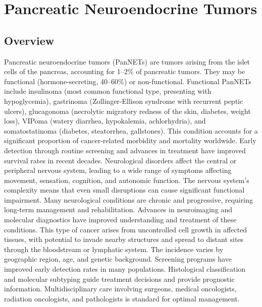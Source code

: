 \chapter{Pancreatic Neuroendocrine Tumors}
\label{sec:Pancreatic Neuroendocrine Tumors}

\section{Overview}
Pancreatic neuroendocrine tumors (PanNETs) are tumors arising from the islet cells of the pancreas, accounting for 1--2\% of pancreatic tumors. They may be functional (hormone-secreting, 40--60\%) or non-functional. Functional PanNETs include insulinoma (most common functional type, presenting with hypoglycemia), gastrinoma (Zollinger-Ellison syndrome with recurrent peptic ulcers), glucagonoma (necrolytic migratory redness of the skin, diabetes, weight loss), VIPoma (watery diarrhea, hypokalemia, achlorhydria), and somatostatinoma (diabetes, steatorrhea, gallstones). This condition accounts for a significant proportion of cancer-related morbidity and mortality worldwide. Early detection through routine screening and advances in treatment have improved survival rates in recent decades. Neurological disorders affect the central or peripheral nervous system, leading to a wide range of symptoms affecting movement, sensation, cognition, and autonomic function. The nervous system's complexity means that even small disruptions can cause significant functional impairment. Many neurological conditions are chronic and progressive, requiring long-term management and rehabilitation. Advances in neuroimaging and molecular diagnostics have improved understanding and treatment of these conditions. This type of cancer arises from uncontrolled cell growth in affected tissues, with potential to invade nearby structures and spread to distant sites through the bloodstream or lymphatic system. The incidence varies by geographic region, age, and genetic background. Screening programs have improved early detection rates in many populations. Histological classification and molecular subtyping guide treatment decisions and provide prognostic information. Multidisciplinary care involving surgeons, medical oncologists, radiation oncologists, and pathologists is standard for optimal management.
